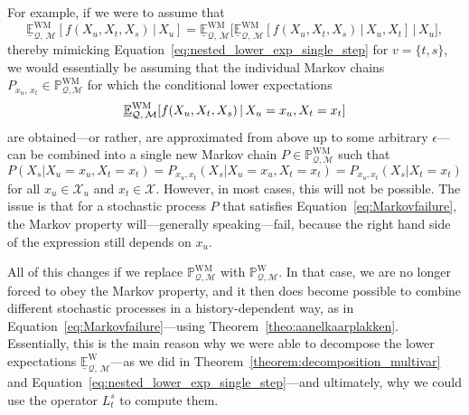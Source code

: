 \documentclass[10pt,a4paper]{paper}
\theoremstyle{definition}
\newcommand{\states}{\mathcal{X}}
\newcommand{\processes}{\mathbb{P}}
\newcommand{\wprocesses}{\processes^{\mathrm{W}}}
\newcommand{\wmprocesses}{\processes^{\mathrm{WM}}}
\newcommand{\rateset}{\mathcal{Q}}
\begin{document}
For example, if we were to assume that
\begin{equation*}%
\underline{\mathbb{E}}_{\rateset,\,\mathcal{M}}^{\mathrm{WM}}[f(X_u,X_t,X_s)\,\vert\,X_u] = \underline{\mathbb{E}}_{\rateset,\,\mathcal{M}}^{\mathrm{WM}}\bigl[ \underline{\mathbb{E}}_{\rateset,\,\mathcal{M}}^{\mathrm{WM}}[f(X_u,X_t,X_s)\,\vert\,X_u,X_t] \,\big\vert\,X_u\bigr],
\end{equation*}
thereby mimicking Equation~\eqref{eq:nested_lower_exp_single_step} for $v=\{t,s\}$, we would essentially be assuming that the individual Markov chains $P_{x_u,\,x_t}\in\wmprocesses_{\rateset,\mathcal{M}}$ for which the conditional lower expectations
\begin{equation*}
\underline{\mathbb{E}}_{\rateset,\,\mathcal{M}}^{\mathrm{WM}}[f(X_u,X_t,X_s)\,\vert\,X_u=x_u,X_t=x_t]\vspace{5pt}
\end{equation*}
are obtained---or rather, are approximated from above up to some arbitrary $\epsilon$---can be combined into a single new Markov chain $P\in\wmprocesses_{\rateset,\mathcal{M}}$ such that
\begin{equation}\label{eq:Markovfailure}
P(X_s\vert X_u=x_u,X_t=x_t)=P_{x_u,x_t}(X_s\vert X_u=x_u,X_t=x_t)=P_{x_u,x_t}(X_s\vert X_t=x_t)
\end{equation}
for all $x_u\in\states_u$ and $x_t\in\states$. However, in most cases, this will not be possible. The issue is that for a stochastic process $P$ that satisfies Equation~\eqref{eq:Markovfailure}, the Markov property will---generally speaking---fail, because the right hand side of the expression still depends on $x_u$.%

All of this changes if we replace $\wmprocesses_{\rateset,\mathcal{M}}$ with $\wprocesses_{\rateset,\mathcal{M}}$. In that case, we are no longer forced to obey the Markov property, and it then does become possible to combine different stochastic processes in a history-dependent way, as in Equation~\eqref{eq:Markovfailure}---using Theorem~\ref{theo:aanelkaarplakken}. Essentially, this is the main reason why we were able to decompose the lower expectations $\underline{\mathbb{E}}_{\rateset,\,\mathcal{M}}^{\mathrm{W}}$---as we did in Theorem~\ref{theorem:decomposition_multivar} and Equation~\eqref{eq:nested_lower_exp_single_step}---and ultimately, why we could use the operator $L_t^s$ to compute them.

\end{document}
